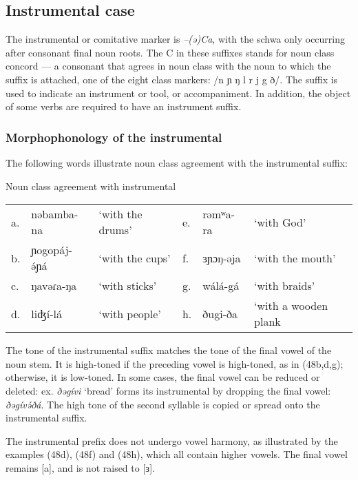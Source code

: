 

\subsection{Instrumental case}\label{sec:ch6:instrumental}

The instrumental or comitative marker is \textit{–(ə)Ca}, with the schwa only occurring after consonant final noun roots. The C in these suffixes stands for noun class concord --- a consonant that agrees in noun class with the noun to which the suffix is attached, one of the eight class markers: /n ɲ ŋ l r j g ð/. The suffix is used to indicate an instrument or tool, or accompaniment. In addition, the object of some verbs are required to have an instrument suffix. 

\subsubsection{Morphophonology of the instrumental}

The following words illustrate noun class agreement with the instrumental suffix:

\ea	Noun class agreement with instrumental\\
\begin{tabular}[t]{llllll}
a.	&	nəbamba-na	&	‘with the drums’	&	e.	&	rəmʷa-ra		&	‘with God’\\
b.	&	ɲogopáj-ə́ɲá	&	‘with the cups’		&	f.	&	ɜɲɔŋ-əja		&	‘with the mouth’\\
c.	&	ŋavəɾa-ŋa	&	‘with sticks’		&	g.	&	wálá-gá		&	‘with braids’\\ %
d.	&	liʤí-lá		&	‘with people’		&	h.	&	ðugi-ða		&	‘with a wooden plank\\
\end{tabular}
\z 

The tone of the instrumental suffix matches the tone of the final vowel of the noun stem. It is high-toned if the preceding vowel is high-toned, as in (48b,d,g); otherwise, it is low-toned.  In some cases, the final vowel can be reduced or deleted: ex. \textit{ðəgívi} ‘bread’ forms its instrumental by dropping the final vowel: \textit{ðəgívə́ðá}. The high tone of the second syllable is copied or spread onto the instrumental suffix. 

The instrumental prefix does not undergo vowel harmony, as illustrated by the examples (48d), (48f) and (48h), which all contain higher vowels. The final vowel remains [a], and is not raised to [ɜ]. 

